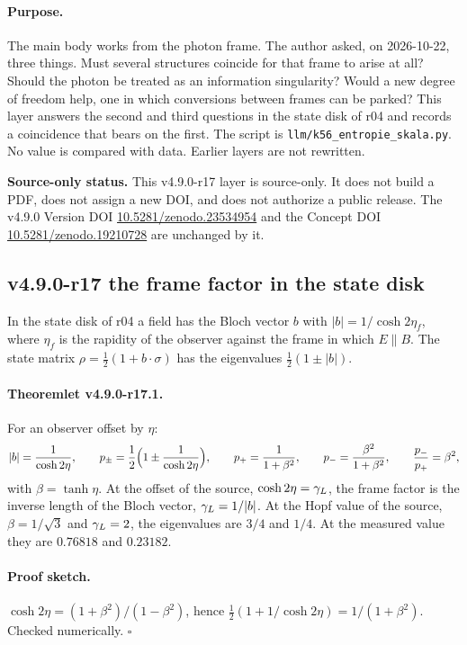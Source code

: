 \paragraph{Purpose.}
The main body works from the photon frame.  The author asked, on 2026-10-22, three things.  Must several structures coincide
for that frame to arise at all?  Should the photon be treated as an information singularity?  Would a new degree of freedom
help, one in which conversions between frames can be parked?  This layer answers the second and third questions in the state
disk of r04 and records a coincidence that bears on the first.  The script is \texttt{llm/k56\_entropie\_skala.py}.  No value
is compared with data.  Earlier layers are not rewritten.

\noindent\textbf{Source-only status.}
This v4.9.0-r17 layer is source-only.  It does not build a PDF, does not assign a new DOI,
and does not authorize a public release.  The v4.9.0 Version DOI
\href{https://doi.org/10.5281/zenodo.23534954}{10.5281/zenodo.23534954} and the Concept DOI
\href{https://doi.org/10.5281/zenodo.19210728}{10.5281/zenodo.19210728} are unchanged by it.

\subsection*{v4.9.0-r17 the frame factor in the state disk}
\label{subsec:v490-r17-frame-factor}

In the state disk of r04 a field has the Bloch vector \(b\) with \(|b|=1/\cosh2\eta_f\), where \(\eta_f\) is the rapidity of the
observer against the frame in which \(E\parallel B\).  The state matrix \(\rho=\tfrac12(1+b\cdot\sigma)\) has the eigenvalues
\(\tfrac12(1\pm|b|)\).

\paragraph{Theoremlet v4.9.0-r17.1.}
For an observer offset by \(\eta\):
\[
|b|=\frac1{\cosh2\eta},\qquad
p_\pm=\frac12\Bigl(1\pm\frac1{\cosh2\eta}\Bigr),\qquad
p_+=\frac1{1+\beta^2},\qquad p_-=\frac{\beta^2}{1+\beta^2},\qquad \frac{p_-}{p_+}=\beta^2,
\]
with \(\beta=\tanh\eta\).  At the offset of the source, \(\cosh2\eta=\gamma_L\), the frame factor is the inverse length of the Bloch
vector, \(\gamma_L=1/|b|\).  At the Hopf value of the source, \(\beta=1/\sqrt3\) and \(\gamma_L=2\), the eigenvalues are \(3/4\) and \(1/4\).
At the measured value they are \(0.76818\) and \(0.23182\).

\paragraph{Proof sketch.}
\(\cosh2\eta=(1+\beta^2)/(1-\beta^2)\), hence \(\tfrac12(1+1/\cosh2\eta)=1/(1+\beta^2)\).  Checked numerically.  \(\square\)


